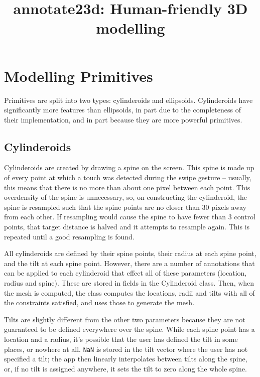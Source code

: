 
\title{annotate23d: Human-friendly 3D modelling}

\maketitle
\section{Modelling Primitives}
Primitives are split into two types: cylinderoids and ellipsoids.  Cylinderoids
have significantly more features than ellipsoids, in part due to the
completeness of their implementation, and in part because they are more powerful
primitives.
\subsection{Cylinderoids}
Cylinderoids are created by drawing a spine on the screen. This spine is made up
of every point at which a touch was detected during the swipe gesture --
usually, this means that there is no more than about one pixel between each
point. This overdensity of the spine is unnecessary, so, on constructing the
cylinderoid, the spine is resampled such that the spine points are no closer
than 30 pixels away from each other. If resampling would cause the spine to have
fewer than 3 control points, that target distance is halved and it attempts to
resample again. This is repeated until a good resampling is found.

All cylinderoids are defined by their spine points, their radius at each spine
point, and the tilt at each spine point. However, there are a number of
annotations that can be applied to each cylinderoid that effect all of these
parameters (location, radius and spine). These are stored in fields in the
Cylinderoid class. Then, when the mesh is computed, the class computes the
locations, radii and tilts with all of the constraints satisfied, and uses those
to generate the mesh.

Tilts are slightly different from the other two parameters because they are not
guaranteed to be defined everywhere over the spine. While each spine point has a
location and a radius, it's possible that the user has defined the tilt in some
places, or nowhere at all. \verb#NaN# is stored in the tilt vector where the
user has not specified a tilt; the app then linearly interpolates between tilts
along the spine, or, if no tilt is assigned anywhere, it sets the tilt to zero
along the whole spine.

